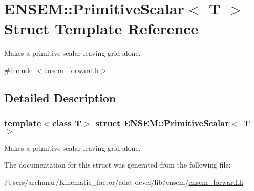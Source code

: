 \hypertarget{structENSEM_1_1PrimitiveScalar}{}\section{E\+N\+S\+EM\+:\+:Primitive\+Scalar$<$ T $>$ Struct Template Reference}
\label{structENSEM_1_1PrimitiveScalar}


Makes a primitive scalar leaving grid alone.  




{\ttfamily \#include $<$ensem\+\_\+forward.\+h$>$}



\subsection{Detailed Description}
\subsubsection*{template$<$class T$>$\newline
struct E\+N\+S\+E\+M\+::\+Primitive\+Scalar$<$ T $>$}

Makes a primitive scalar leaving grid alone. 

The documentation for this struct was generated from the following file\+:\begin{DoxyCompactItemize}
\item 
/\+Users/archanar/\+Kinematic\+\_\+factor/adat-\/devel/lib/ensem/\mbox{\hyperlink{adat-devel_2lib_2ensem_2ensem__forward_8h}{ensem\+\_\+forward.\+h}}\end{DoxyCompactItemize}
